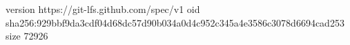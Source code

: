 version https://git-lfs.github.com/spec/v1
oid sha256:929bbf9da3cdf04d68dc57d90b034a0d4c952c345a4e3586c3078d6694cad253
size 72926
